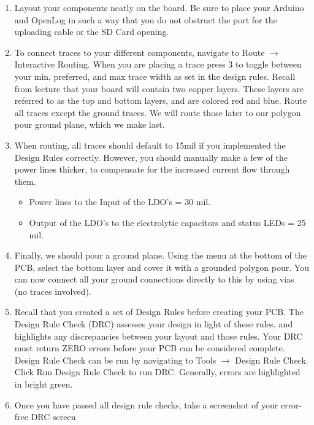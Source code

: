 \documentclass[12pt]{article}
\begin{document}
\begin{enumerate}
    \item Layout your components neatly on the board. Be sure to place your Arduino and OpenLog in such a way that you do not obstruct the port for the uploading cable or the SD Card opening. 
    \item To connect traces to your different components, navigate to Route $\rightarrow$ Interactive Routing. When you are placing a trace press 3 to toggle between your min, preferred, and max trace width as set in the design rules.  Recall from lecture that your board will contain two copper layers. These layers are referred to as the top and bottom layers, and are colored red and blue. Route all traces except the ground traces. We will route those later to our polygon pour ground plane, which we make last.
    
    \item When routing, all traces should default to 15mil if you implemented the Design Rules correctly. However, you should manually make a few of the power lines thicker, to compensate for the increased current flow through them. 
    
    \begin{itemize}
    \item Power lines to the Input of the LDO's = 30 mil.
    \item Output of the LDO's to the electrolytic capacitors and status LEDs = 25 mil.
    \end{itemize}
    \item Finally, we should pour a ground plane. Using the menu at the bottom of the PCB, select the bottom layer and cover it with a grounded polygon pour. You can now connect all your ground connections directly to this by using vias (no traces involved).
    
    \item Recall that you created a set of Design Rules before creating your PCB. The Design Rule Check (DRC) assesses your design in light of these rules, and highlights any discrepancies between your layout and those rules. Your DRC must return ZERO errors before your PCB can be considered complete.
    Design Rule Check can be run by navigating to Tools $\rightarrow$ Design Rule Check. Click Run Design Rule Check to run DRC. Generally, errors are highlighted in bright green.
    
    \item Once you have passed all design rule checks, take a screenshot of your error-free DRC screen
    
    \end{enumerate}
	
\end{document}
